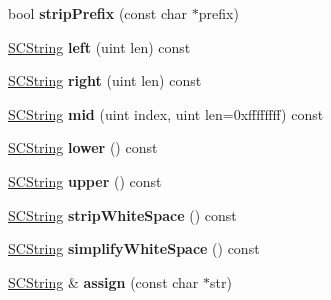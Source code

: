 \begin{DoxyCompactItemize}
\item 
\hypertarget{class_s_c_string_a8bc9337f47d29d6876ecfc0754a35334}{bool {\bfseries strip\-Prefix} (const char $\ast$prefix)}\label{class_s_c_string_a8bc9337f47d29d6876ecfc0754a35334}

\item 
\hypertarget{class_s_c_string_a044ed9f641a03c15ee733f772f353744}{\hyperlink{class_s_c_string}{S\-C\-String} {\bfseries left} (uint len) const }\label{class_s_c_string_a044ed9f641a03c15ee733f772f353744}

\item 
\hypertarget{class_s_c_string_a512edfe64c4fc79254eda16aada38328}{\hyperlink{class_s_c_string}{S\-C\-String} {\bfseries right} (uint len) const }\label{class_s_c_string_a512edfe64c4fc79254eda16aada38328}

\item 
\hypertarget{class_s_c_string_a6d8344296c6ffa0eecb24c28b429f54e}{\hyperlink{class_s_c_string}{S\-C\-String} {\bfseries mid} (uint index, uint len=0xffffffff) const }\label{class_s_c_string_a6d8344296c6ffa0eecb24c28b429f54e}

\item 
\hypertarget{class_s_c_string_a874d76b10da46dc72448bb93619b5287}{\hyperlink{class_s_c_string}{S\-C\-String} {\bfseries lower} () const }\label{class_s_c_string_a874d76b10da46dc72448bb93619b5287}

\item 
\hypertarget{class_s_c_string_accbc9ade5994e46dcff575a89c7b387b}{\hyperlink{class_s_c_string}{S\-C\-String} {\bfseries upper} () const }\label{class_s_c_string_accbc9ade5994e46dcff575a89c7b387b}

\item 
\hypertarget{class_s_c_string_a511d8da2642de7997fd83e1d2efede46}{\hyperlink{class_s_c_string}{S\-C\-String} {\bfseries strip\-White\-Space} () const }\label{class_s_c_string_a511d8da2642de7997fd83e1d2efede46}

\item 
\hypertarget{class_s_c_string_aa0309a995f2d50bdf3b7620f31fca73b}{\hyperlink{class_s_c_string}{S\-C\-String} {\bfseries simplify\-White\-Space} () const }\label{class_s_c_string_aa0309a995f2d50bdf3b7620f31fca73b}

\item 
\hypertarget{class_s_c_string_aa75ea65347f593744254d088cc21d80f}{\hyperlink{class_s_c_string}{S\-C\-String} \& {\bfseries assign} (const char $\ast$str)}\label{class_s_c_string_aa75ea65347f593744254d088cc21d80f}


\end{DoxyCompactItemize}
